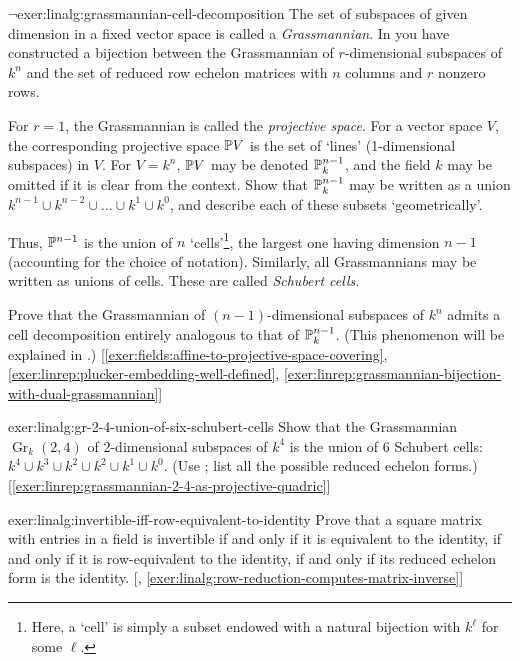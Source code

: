 \begin{exer}{$\lnot$}{exer:linalg:grassmannian-cell-decomposition}
  The set of subspaces of given dimension in a fixed vector space is
  called a \emph{Grassmannian}. In
   you
  have constructed a bijection between the Grassmannian of
  $r$-dimensional subspaces of $k^n$ and the set of reduced row
  echelon matrices with $n$ columns and $r$ nonzero rows.

  For $r = 1$, the Grassmannian is called the \emph{projective space}.
  For a vector space $V$, the corresponding projective space
  $\field{P}V$ is the set of `lines' (1-dimensional subspaces) in
  $V$. For $V = k^n$, $\field{P}V$ may be denoted $\P_k^{n-1}$, and
  the field $k$ may be omitted if it is clear from the context. Show
  that $\P_k^{n-1}$ may be written as a union
  $k^{n-1} \cup k^{n-2} \cup \dots \cup k^1 \cup k^0$, and describe
  each of these subsets `geometrically'.

  Thus, $\P^{n-1}$ is the union of $n$ `cells'\footnote{Here, a `cell'
    is simply a subset endowed with a natural bijection with $k^\ell$
    for some $\ell$.}, the largest one having dimension $n-1$
  (accounting for the choice of notation). Similarly, all
  Grassmannians may be written as unions of cells. These are called
  \emph{Schubert cells}.

  Prove that the Grassmannian of $(n-1)$-dimensional subspaces of
  $k^n$ admits a cell decomposition entirely analogous to that of
  $\P_k^{n-1}$. (This phenomenon will be explained in
  .)
  [\ref{exer:fields:affine-to-projective-space-covering},
  \ref{exer:linrep:plucker-embedding-well-defined},
  \ref{exer:linrep:grassmannian-bijection-with-dual-grassmannian}]
\end{exer}
\begin{exer}{\exerused}{exer:linalg:gr-2-4-union-of-six-schubert-cells}
  Show that the Grassmannian $\operatorname{Gr}_k(2,4)$ of
  2-dimensional subspaces of $k^4$ is the union of 6 Schubert cells:
  $k^4 \cup k^3 \cup k^2 \cup k^2 \cup k^1 \cup k^0$. (Use
  ; list
  all the possible reduced echelon forms.)
  [\ref{exer:linrep:grassmannian-2-4-as-projective-quadric}]
\end{exer}
\begin{exer}{\exerused}{exer:linalg:invertible-iff-row-equivalent-to-identity}
  Prove that a square matrix with entries in a field is invertible if
  and only if it is equivalent to the identity, if and only if it is
  row-equivalent to the identity, if and only if its reduced echelon
  form is the
  identity. [,
  \ref{exer:linalg:row-reduction-computes-matrix-inverse}]
\end{exer}
